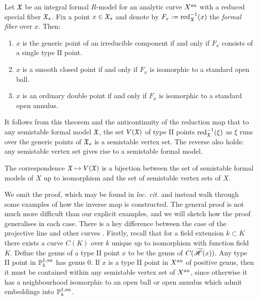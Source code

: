 \begin{theorem} \label{boshlutkebohmert} \parencite[Prop. 2.3]{boschlutkebohmert} \parencite[Theorem 4.3.1]{berk1} Let $\mathfrak{X}$ be an integral formal $R$-model for an analytic curve $X^{\text{an}}$ with a reduced special fiber $\mathfrak{X}_s$. 
Fix a point $x \in \mathfrak{X}_s$ and denote by $F_x := \operatorname{red}^{-1}_{\mathfrak{X}}(x)$ the \textit{formal fiber} over $x$. Then:
    \begin{enumerate}
        \item $x$ is the generic point of an irreducible component if and only if $F_x$ consists of a single type II point.
        \item $x$ is a smooth closed point if and only if $F_x$ is isomorphic to a standard open ball.
        \item $x$ is an ordinary double point if and only if $F_x$ is isomorphic to a standard open annulus.
    \end{enumerate}
\end{theorem}

It follows from this theorem and the anticontinuity of the reduction map that to any semistable formal model $\mathfrak{X}$, the set $V(\mathfrak{X})$ of type II points $\operatorname{red}_{\mathfrak{X}}^{-1}(\xi)$ as $\xi$ runs over the generic points of $\mathfrak{X}_s$ is a semistable vertex set.
The reverse also holds: any semistable vertex set gives rise to a semistable formal model.

\begin{theorem}\label{semistablecorrespondence} \parencite[Theorem 4.11]{bpr}
    The correspondence $\mathfrak{X} \mapsto V(\mathfrak{X})$ is a bijection between the set of semistable formal models of $X$ up to isomorphism and the set of semistable vertex sets of $X$.
\end{theorem}

We omit the proof, which may be found in \textit{loc. cit.} and instead walk through some examples of how the inverse map is constructed.
The general proof is not much more difficult than our explicit examples, and we will sketch how the proof generalises in each case.
There is a key difference between the case of the projective line and other curves \parencite[Remark 4.17]{bpr}.
Firstly, recall that for a field extension $k \subset K$ there exists a curve $C(K)$ over $k$ unique up to isomorphism with function field $K$.
Define the genus of a type II point $x$ to be the genus of $C(\widetilde{\mathscr{H}}(x))$.
Any type II point in $\mathbb{P}^{1, \text{an}}_{k}$ has genus $0$.
If $x$ is a type II point in $X^{\text{an}}$ of positive genus, then it must be contained within any semistable vertex set of $X^{\text{an}}$, since otherwise it has a neighbourhood isomorphic to an open ball or open annulus which admit embeddings into $\mathbb{P}^{1, \text{an}}_{k}$.

